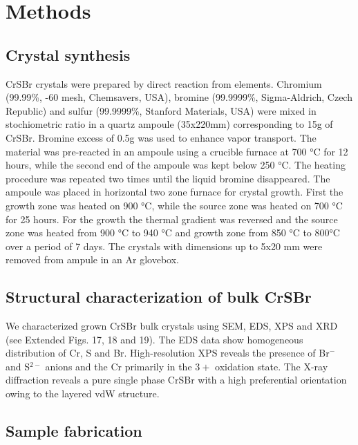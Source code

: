 \documentclass[aps,prl,showpacs,twocolumn,superscriptaddress,floatfix]{revtex4-2}
\begin{document}
%

\section{Methods}

\subsection{Crystal synthesis}

CrSBr crystals were prepared by direct reaction from elements. Chromium (99.99\%, -60 mesh, Chemsavers, USA), bromine (99.9999\%, Sigma-Aldrich, Czech Republic) and sulfur (99.9999\%, Stanford Materials, USA) were mixed in stochiometric ratio in a quartz ampoule (35x220mm) corresponding to 15g of CrSBr. Bromine excess of 0.5g was used to enhance vapor transport. The material was pre-reacted in an ampoule using a crucible furnace at 700 °C for 12 hours, while the second end of the ampoule was kept below 250 °C. The heating procedure was repeated two times until the liquid bromine disappeared. The ampoule was placed in horizontal two zone furnace for crystal growth. First the growth zone was heated on 900 °C, while the source zone was heated on 700 °C for 25 hours. For the growth the thermal gradient was reversed and the source zone was heated from 900 °C to 940 °C and growth zone from 850 °C to 800°C over a period of 7 days. The crystals with dimensions up to 5x20 mm were removed from ampule in an Ar glovebox. 

\subsection{Structural characterization of bulk CrSBr}

We characterized grown CrSBr bulk crystals using SEM, EDS, XPS and XRD (see Extended Figs. 17, 18 and 19). The EDS data show homogeneous distribution of Cr, S and Br. High-resolution XPS reveals the presence of Br$^-$ and S$^{2-}$ anions and the Cr primarily in the $3+$ oxidation state. The X-ray diffraction reveals a pure single phase CrSBr with a high preferential orientation owing to the layered vdW structure.

\subsection{Sample fabrication}
\end{document}
